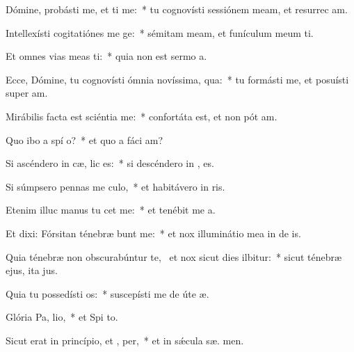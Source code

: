 \item Dómine, probásti me, et ti me:~* tu cognovísti sessiónem meam, et resurrec am.
\item Intellexísti cogitatiónes me  ge:~* sémitam meam, et funículum meum ti.
\item Et omnes vias meas ti:~* quia non est sermo   a.
\item Ecce, Dómine, tu cognovísti ómnia novíssima,  qua:~* tu formásti me, et posuísti super   am.
\item Mirábilis facta est sciéntia   me:~* confortáta est, et non pót  am.
\item Quo ibo a spí o?~* et quo a fáci  am?
\item Si ascéndero in cæ,  lic es:~* si descéndero in , es.
\item Si súmpsero pennas me culo,~* et habitávero in  ris.
\item Etenim illuc manus tu cet me:~* et tenébit me  a.
\item Et dixi: Fórsitan ténebræ bunt me:~* et nox illuminátio mea in de is.
\item Quia ténebræ non obscurabúntur  te,~\pscross{} et nox sicut dies ilbitur:~* sicut ténebræ ejus, ita   jus.
\item Quia tu possedísti  os:~* suscepísti me de úte  æ.
\item Glória Pa,  lio,~* et Spi to.
\item Sicut erat in princípio, et ,  per,~* et in sǽcula sæ. men.
